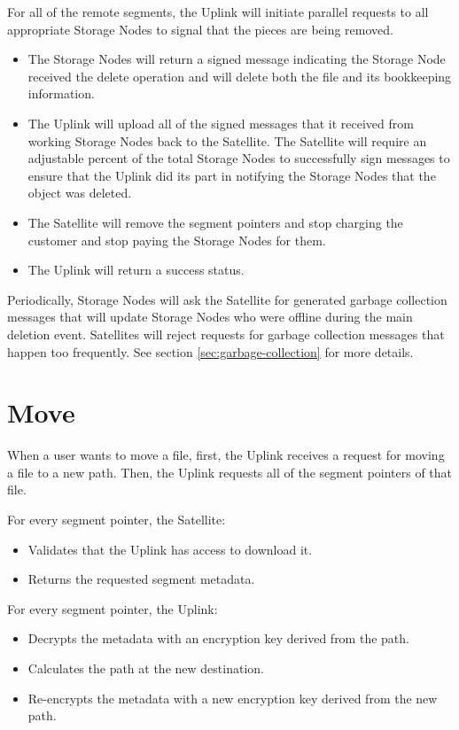 \documentclass[8pt,fleqn,openany]{book}
\begin{document}
For all of the remote segments, the Uplink will
  initiate parallel requests to all appropriate Storage Nodes to signal that the
  pieces are being removed.

\begin{itemize}
\item The Storage Nodes will return a signed message indicating the Storage Node
received the
delete operation and will delete both the file and its bookkeeping information.
\item The Uplink will upload all of the signed messages that it received from
  working Storage Nodes back to the Satellite. The Satellite will require an
  adjustable percent of the total Storage Nodes to successfully sign messages
  to ensure that the Uplink did its part in notifying the Storage Nodes that the
  object was deleted.
\item The Satellite will remove the segment pointers and stop charging the
  customer and stop paying the Storage Nodes for them.
\item The Uplink will return a success status.
\end{itemize}

Periodically, Storage Nodes will ask the Satellite for generated garbage
  collection messages that will update Storage Nodes who were offline during the
  main deletion event.
  Satellites will reject requests for garbage collection messages that
  happen too frequently. See section \ref{sec:garbage-collection} for more
  details.

\section{Move}

When a user wants to move a file,
first, the Uplink receives a request for moving a file to a new path.
Then, the Uplink requests all of the segment pointers of that file.

For every segment pointer, the Satellite:
  \begin{itemize}
  \item Validates that the Uplink has access to download it.
  \item Returns the requested segment metadata.
  \end{itemize}

For every segment pointer, the Uplink:
  \begin{itemize}
  \item Decrypts the metadata with an encryption key derived from the path.
  \item Calculates the path at the new destination.
  \item Re-encrypts the metadata with a new encryption key derived from the
    new path.
  \end{itemize}
\end{document}
